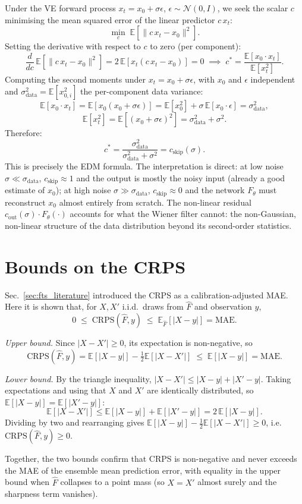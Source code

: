 Under the VE forward process $x_t = x_0 + \sigma\epsilon$,
$\epsilon\sim\mathcal{N}(0,I)$, we seek the scalar $c$ minimising the mean
squared error of the linear predictor $c\,x_t$:
\[
    \min_c\;\mathbb{E}\!\left[\|c\,x_t - x_0\|^2\right].
\]
Setting the derivative with respect to $c$ to zero (per component):
\[
    \frac{d}{dc}\,\mathbb{E}\!\left[\|c\,x_t - x_0\|^2\right]
    = 2\,\mathbb{E}\!\left[x_t(c\,x_t - x_0)\right] = 0
    \;\implies\;
    c^* = \frac{\mathbb{E}[x_0 \cdot x_t]}{\mathbb{E}[x_t^2]}.
\]
Computing the second moments under $x_t = x_0 + \sigma\epsilon$, with $x_0$
and $\epsilon$ independent and $\sigma_{\text{data}}^2 = \mathbb{E}[x_{0,i}^2]$
the per-component data variance:
\[
    \mathbb{E}[x_0 \cdot x_t]
    = \mathbb{E}[x_0(x_0+\sigma\epsilon)]
    = \mathbb{E}[x_0^2] + \sigma\,\mathbb{E}[x_0\cdot\epsilon]
    = \sigma_{\text{data}}^2,
\]
\[
    \mathbb{E}[x_t^2]
    = \mathbb{E}[(x_0+\sigma\epsilon)^2]
    = \sigma_{\text{data}}^2 + \sigma^2.
\]
Therefore:
\[
    c^* = \frac{\sigma_{\text{data}}^2}{\sigma_{\text{data}}^2 + \sigma^2}
    = c_{\text{skip}}(\sigma).
\]
This is precisely the EDM formula. The interpretation is direct: at low noise
$\sigma \ll \sigma_{\text{data}}$, $c_{\text{skip}}\approx 1$ and the output
is mostly the noisy input (already a good estimate of $x_0$); at high noise
$\sigma \gg \sigma_{\text{data}}$, $c_{\text{skip}}\approx 0$ and the network
$F_\theta$ must reconstruct $x_0$ almost entirely from scratch. The non-linear
residual $c_{\text{out}}(\sigma)\cdot F_\theta(\cdot)$ accounts for what the
Wiener filter cannot: the non-Gaussian, non-linear structure of the data
distribution beyond its second-order statistics.

\section{Bounds on the CRPS}
\label{app:sec:crps_bounds}

Sec.\ \ref{sec:fts_literature} introduced the CRPS as a calibration-adjusted
MAE. Here it is shown that, for $X,X'$ i.i.d.\ draws from $\hat{F}$ and
observation $y$,
\[
    0 \;\le\; \text{CRPS}(\hat{F}, y) \;\le\; \mathbb{E}_{\hat{F}}\!\left[|X-y|\right]
    = \text{MAE}.
\]

\textit{Upper bound.} Since $|X-X'|\ge 0$, its expectation is non-negative, so
\[
    \text{CRPS}(\hat{F}, y)
    = \mathbb{E}\!\left[|X-y|\right] - \tfrac{1}{2}\mathbb{E}\!\left[|X-X'|\right]
    \;\le\; \mathbb{E}\!\left[|X-y|\right] = \text{MAE}.
\]

\textit{Lower bound.} By the triangle inequality, $|X-X'| \le |X-y| +
|X'-y|$. Taking expectations and using that $X$ and $X'$ are identically
distributed, so $\mathbb{E}[|X-y|] = \mathbb{E}[|X'-y|]$:
\[
    \mathbb{E}\!\left[|X-X'|\right]
    \le \mathbb{E}\!\left[|X-y|\right] + \mathbb{E}\!\left[|X'-y|\right]
    = 2\,\mathbb{E}\!\left[|X-y|\right].
\]
Dividing by two and rearranging gives $\mathbb{E}[|X-y|] - \tfrac{1}{2}
\mathbb{E}[|X-X'|] \ge 0$, i.e. $\text{CRPS}(\hat{F}, y) \ge 0$.

Together, the two bounds confirm that CRPS is non-negative and never exceeds
the MAE of the ensemble mean prediction error, with equality in the upper
bound when $\hat{F}$ collapses to a point mass (so $X=X'$ almost surely and
the sharpness term vanishes).